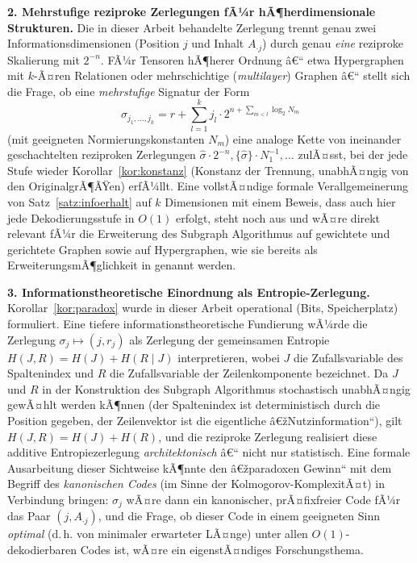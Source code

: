 ﻿\documentclass[a4paper,12pt]{article}
\theoremstyle{definition}
\begin{document}
\textbf{2. Mehrstufige reziproke Zerlegungen fÃ¼r hÃ¶herdimensionale
Strukturen.} Die in dieser Arbeit behandelte Zerlegung trennt genau zwei
Informationsdimensionen (Position $j$ und Inhalt $A_{\cdot j}$) durch genau
\emph{eine} reziproke Skalierung mit $2^{-n}$. FÃ¼r Tensoren hÃ¶herer Ordnung
â€“ etwa Hypergraphen mit $k$-Ã¤ren Relationen oder mehrschichtige
(\emph{multilayer}) Graphen â€“ stellt sich die Frage, ob eine
\emph{mehrstufige} Signatur der Form
\[
	\sigma_{j_1,\ldots,j_k} = r + \sum_{l=1}^{k} j_l \cdot 2^{n + \sum_{m<l} \log_2 N_m}
\]
(mit geeigneten Normierungskonstanten $N_m$) eine analoge Kette von
ineinander geschachtelten reziproken Zerlegungen
$\hat\sigma \cdot 2^{-n}, \{\hat\sigma\}\cdot N_1^{-1}, \ldots$ zulÃ¤sst, bei
der jede Stufe wieder Korollar~\ref{kor:konstanz} (Konstanz der Trennung,
unabhÃ¤ngig von den OriginalgrÃ¶ÃŸen) erfÃ¼llt. Eine vollstÃ¤ndige formale
Verallgemeinerung von Satz~\ref{satz:infoerhalt} auf $k$ Dimensionen mit
einem Beweis, dass auch hier jede Dekodierungsstufe in $O(1)$ erfolgt, steht
noch aus und wÃ¤re direkt relevant fÃ¼r die Erweiterung des Subgraph
Algorithmus auf gewichtete und gerichtete Graphen sowie auf Hypergraphen,
wie sie bereits als ErweiterungsmÃ¶glichkeit in \cite{epp2026subgraph}
genannt werden.

\textbf{3. Informationstheoretische Einordnung als Entropie-Zerlegung.}
Korollar~\ref{kor:paradox} wurde in dieser Arbeit operational (Bits,
Speicherplatz) formuliert. Eine tiefere informationstheoretische Fundierung
wÃ¼rde die Zerlegung $\sigma_j \mapsto (j, r_j)$ als Zerlegung der
gemeinsamen Entropie $H(J, R) = H(J) + H(R\mid J)$ interpretieren, wobei $J$
die Zufallsvariable des Spaltenindex und $R$ die Zufallsvariable der
Zeilenkomponente bezeichnet. Da $J$ und $R$ in der Konstruktion des
Subgraph Algorithmus stochastisch unabhÃ¤ngig gewÃ¤hlt werden kÃ¶nnen (der
Spaltenindex ist deterministisch durch die Position gegeben, der
Zeilenvektor ist die eigentliche â€žNutzinformation``), gilt
$H(J,R) = H(J) + H(R)$, und die reziproke Zerlegung realisiert diese additive
Entropiezerlegung \emph{architektonisch} â€“ nicht nur statistisch. Eine
formale Ausarbeitung dieser Sichtweise kÃ¶nnte den â€žparadoxen Gewinn`` mit dem
Begriff des \emph{kanonischen Codes} (im Sinne der Kolmogorov-KomplexitÃ¤t)
in Verbindung bringen: $\sigma_j$ wÃ¤re dann ein kanonischer, prÃ¤fixfreier
Code fÃ¼r das Paar $(j, A_{\cdot j})$, und die Frage, ob dieser Code in einem
geeigneten Sinn \emph{optimal} (d.\,h. von minimaler erwarteter LÃ¤nge) unter
allen $O(1)$-dekodierbaren Codes ist, wÃ¤re ein eigenstÃ¤ndiges
Forschungsthema.
\end{document}
